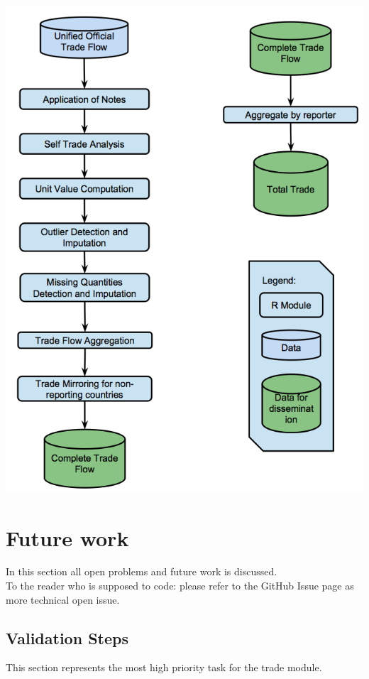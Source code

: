 \documentclass[nojss]{jss}\usepackage[]{graphicx}\usepackage[]{color}
\begin{document}
\begin{center}\includegraphics[scale = 0.01]{"trade_1_bis"}\end{center}


\newpage
\section{Future work}
In this section all open problems and future work is discussed.\\
To the reader who is supposed to code: please refer to the GitHub Issue page as more technical open issue.\\

\subsection{Validation Steps}
This section represents the most high priority task for the trade module.\\
\end{document}
